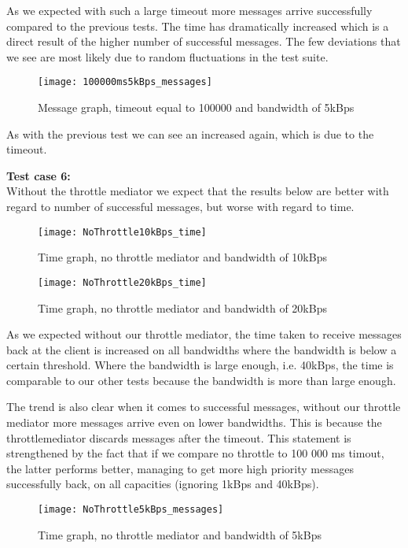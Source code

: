 	As we expected with such a large timeout more messages arrive successfully compared to the previous tests. The time has dramatically increased which is a direct result of the higher number of successful messages. The few deviations that we see are most likely due to random fluctuations in the test suite. 
	
	\begin{figure}[H]
		\centering
		\texttt{[image: 100000ms5kBps\_messages]}
		\caption{Message graph, timeout equal to 100000 and bandwidth of 5kBps} 
		\label{figure:results:100000ms5kBps_messages}
	\end{figure}
	As with the previous test we can see an increased again, which is due to the timeout.
    
    \textbf{Test case 6:}\\
    Without the throttle mediator we expect that the results below are better with regard to number of successful messages, but worse with regard to time.
    \begin{figure}[H]
		\centering
		\texttt{[image: NoThrottle10kBps\_time]}
		\caption{Time graph, no throttle mediator and bandwidth of 10kBps} 
		\label{figure:results:NoThrottle10kBps_time}
	\end{figure}
	
	\begin{figure}[H]
		\centering
		\texttt{[image: NoThrottle20kBps\_time]}
		\caption{Time graph, no throttle mediator and bandwidth of 20kBps} 
		\label{figure:results:NoThrottle20kBps_time}
	\end{figure}
	
	As we expected without our throttle mediator, the time taken to receive messages back at the client is increased on all bandwidths where the bandwidth is below a certain threshold. Where the bandwidth is large enough, i.e. 40kBps, the time is comparable to our other tests because the bandwidth is more than large enough.
	
	The trend is also clear when it comes to successful messages, without our throttle mediator more messages arrive even on lower bandwidths. This is because the throttlemediator discards messages after the timeout. This statement is strengthened by the fact that if we compare no throttle to 100 000 ms timout, the latter performs better, managing to get more high priority messages successfully back, on all capacities (ignoring 1kBps and 40kBps).
	
	\begin{figure}[H]
		\centering
		\texttt{[image: NoThrottle5kBps\_messages]}
		\caption{Time graph, no throttle mediator and bandwidth of 5kBps} 
		\label{figure:results:NoThrottle5kBps_messages}
	\end{figure}\\

